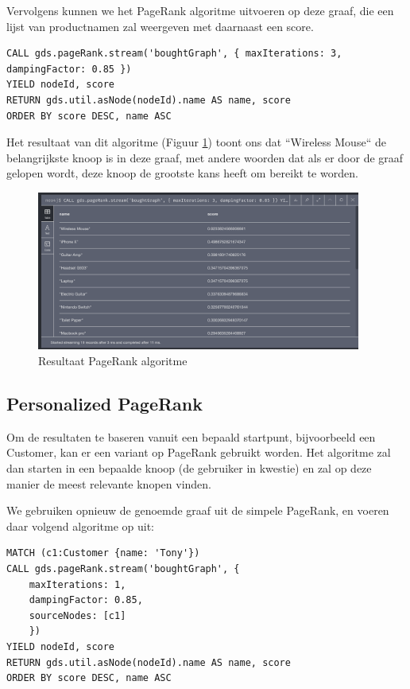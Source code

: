 Vervolgens kunnen we het PageRank algoritme uitvoeren op deze graaf, die een lijst van productnamen zal weergeven met daarnaast een score.

\begin{lstlisting}[caption={PageRank algoritme uitvoeren}]
CALL gds.pageRank.stream('boughtGraph', { maxIterations: 3, dampingFactor: 0.85 })
YIELD nodeId, score
RETURN gds.util.asNode(nodeId).name AS name, score
ORDER BY score DESC, name ASC
\end{lstlisting}

Het resultaat van dit algoritme (Figuur \ref{fig:simplePageRankResult}) toont ons dat ``Wireless Mouse`` de belangrijkste knoop is in deze graaf, met andere woorden dat als er door de graaf gelopen wordt, deze knoop de grootste kans heeft om bereikt te worden. 

\begin{figure} [ht]
	\centering
	\includegraphics[width=0.95\textwidth]{img/pageRank_res_1}
	\caption{Resultaat PageRank algoritme}
	\label{fig:simplePageRankResult}
\end{figure}

\newpage
\subsection{Personalized PageRank}
\label{sec:Personalized PageRank}

Om de resultaten te baseren vanuit een bepaald startpunt, bijvoorbeeld een Customer, kan er een variant op PageRank gebruikt worden. Het algoritme zal dan starten in een bepaalde knoop (de gebruiker in kwestie) en zal op deze manier de meest relevante knopen vinden.

We gebruiken opnieuw de genoemde graaf uit de simpele PageRank, en voeren daar volgend algoritme op uit: 

\begin{lstlisting}[caption={Personalized PageRank algoritme }]
MATCH (c1:Customer {name: 'Tony'})
CALL gds.pageRank.stream('boughtGraph', {
	maxIterations: 1,
	dampingFactor: 0.85,
	sourceNodes: [c1]
	})
YIELD nodeId, score
RETURN gds.util.asNode(nodeId).name AS name, score
ORDER BY score DESC, name ASC
\end{lstlisting}

